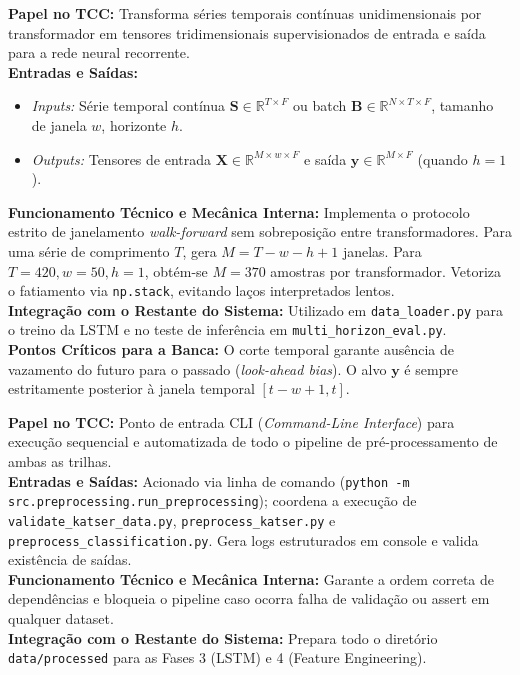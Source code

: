 \documentclass[10pt,a4paper]{article}
\begin{document}
\begin{filebox}
\textbf{Papel no TCC:} Transforma séries temporais contínuas unidimensionais por transformador em tensores tridimensionais supervisionados de entrada e saída para a rede neural recorrente.\\
\textbf{Entradas e Saídas:}
\begin{itemize}[leftmargin=*,itemsep=1pt]
  \item \textit{Inputs:} Série temporal contínua $\mathbf{S} \in \mathbb{R}^{T \times F}$ ou batch $\mathbf{B} \in \mathbb{R}^{N \times T \times F}$, tamanho de janela $w$, horizonte $h$.
  \item \textit{Outputs:} Tensores de entrada $\mathbf{X} \in \mathbb{R}^{M \times w \times F}$ e saída $\mathbf{y} \in \mathbb{R}^{M \times F}$ (quando $h=1$).
\end{itemize}
\textbf{Funcionamento Técnico e Mecânica Interna:} Implementa o protocolo estrito de janelamento \textit{walk-forward} sem sobreposição entre transformadores. Para uma série de comprimento $T$, gera $M = T - w - h + 1$ janelas. Para $T=420, w=50, h=1$, obtém-se $M=370$ amostras por transformador. Vetoriza o fatiamento via \texttt{np.stack}, evitando laços interpretados lentos.\\
\textbf{Integração com o Restante do Sistema:} Utilizado em \texttt{data\_loader.py} para o treino da LSTM e no teste de inferência em \texttt{multi\_horizon\_eval.py}.\\
\textbf{Pontos Críticos para a Banca:} O corte temporal garante ausência de vazamento do futuro para o passado (\textit{look-ahead bias}). O alvo $\mathbf{y}$ é sempre estritamente posterior à janela temporal $[t-w+1, t]$.
\end{filebox}

\begin{filebox}
\textbf{Papel no TCC:} Ponto de entrada CLI (\textit{Command-Line Interface}) para execução sequencial e automatizada de todo o pipeline de pré-processamento de ambas as trilhas.\\
\textbf{Entradas e Saídas:} Acionado via linha de comando (\texttt{python -m src.preprocessing.run\_preprocessing}); coordena a execução de \texttt{validate\_katser\_data.py}, \texttt{preprocess\_katser.py} e \texttt{preprocess\_classification.py}. Gera logs estruturados em console e valida existência de saídas.\\
\textbf{Funcionamento Técnico e Mecânica Interna:} Garante a ordem correta de dependências e bloqueia o pipeline caso ocorra falha de validação ou assert em qualquer dataset.\\
\textbf{Integração com o Restante do Sistema:} Prepara todo o diretório \texttt{data/processed} para as Fases 3 (LSTM) e 4 (Feature Engineering).
\end{filebox}
\end{document}
